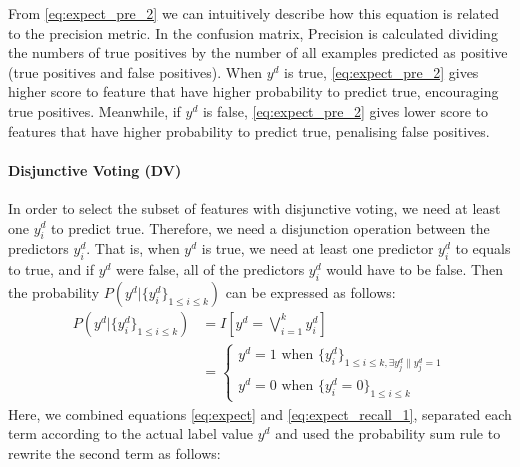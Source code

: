 From \eqref{eq:expect_pre_2} we can intuitively describe how this
equation is related to the precision metric. In the confusion matrix,
Precision is calculated dividing the numbers of true positives by the
number of all examples predicted as positive (true positives and false
positives). When $y^d$ is true, \eqref{eq:expect_pre_2} gives higher
score to feature that have higher probability to predict true,
encouraging true positives. Meanwhile, if $y^d$ is false,
\eqref{eq:expect_pre_2} gives lower score to features that have higher
probability to predict true, penalising false positives.

\paragraph{Disjunctive Voting (DV)}
In order to select the subset of features with disjunctive voting,
we need at least one $y^d_i$ to predict true. Therefore, we
need a disjunction operation between the predictors $y^d_i$. That is,
when $y^d$ is true, we need at least one predictor $y^d_i$ to equals
to true, and if $y^d$ were false, all of the predictors $y^d_i$ would
have to be false. Then the probability $P\left(y^d|\{y^d_i\}_{1\leq
  i\leq k}\right)$ can be expressed as follows:
{\small 
\begin{align}
P\left(y^d|\{y^d_i\}_{1\leq i\leq k}\right) & =I\left[y^d=\bigvee_{i=1}^k y^d_i\right] \nonumber \\
& = \begin{cases}
	y^d=1 \text{ when } \{y_i^d\}_{1\leq i\leq k,\exists{y_j^d\|y_j^d=1}}\\
	y^d=0 \text{ when } \{y_i^d=0\}_{1\leq i\leq k}
\end{cases}\label{eq:expect_recall_1}
\end{align}}
Here, we combined equations \eqref{eq:expect} and
\eqref{eq:expect_recall_1}, separated each term according to the
actual label value $y^d$ and used the probability sum rule to rewrite
the second term as follows:
